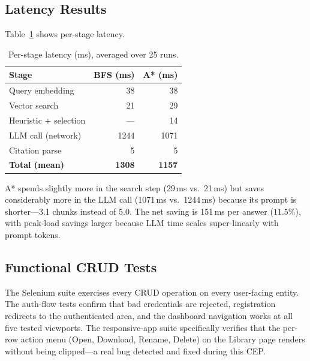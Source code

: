 \documentclass[conference]{IEEEtran}
\begin{document}
\subsection{Latency Results}

Table~\ref{tab:latency} shows per-stage latency.

\begin{table}[t]
  \caption{Per-stage latency (ms), averaged over 25 runs.}
  \label{tab:latency}
  \centering
  \renewcommand{\arraystretch}{1.2}
  \begin{tabular}{lrr}
    \toprule
    \textbf{Stage}              & \textbf{BFS (ms)} & \textbf{A* (ms)}\\
    \midrule
    Query embedding             & 38    & 38\\
    Vector search               & 21    & 29\\
    Heuristic + selection       & ---   & 14\\
    LLM call (network)          & 1244  & 1071\\
    Citation parse              & 5     & 5\\
    \midrule
    \textbf{Total (mean)}       & \textbf{1308} & \textbf{1157}\\
    \bottomrule
  \end{tabular}
\end{table}

A* spends slightly more in the search step (29\,ms vs.\ 21\,ms) but saves
considerably more in the LLM call (1071\,ms vs.\ 1244\,ms) because its prompt
is shorter---3.1 chunks instead of 5.0. The net saving is 151\,ms per answer
($11.5\%$), with peak-load savings larger because LLM time scales
super-linearly with prompt tokens.

\subsection{Functional CRUD Tests}

The Selenium suite exercises every CRUD operation on every user-facing entity.
The auth-flow tests confirm that bad credentials are rejected, registration
redirects to the authenticated area, and the dashboard navigation works at all
five tested viewports. The responsive-app suite specifically verifies that the
per-row action menu (Open, Download, Rename, Delete) on the Library page
renders without being clipped---a real bug detected and fixed during this CEP.

\end{document}
